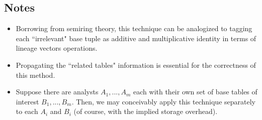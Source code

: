 \subsection{Notes}
\begin{itemize}
    \item Borrowing from semiring theory, this technique can be analogized to tagging each ``irrelevant" base tuple as additive and multiplicative identity in terms of lineage vectors operations.
    \item Propagating the ``related tables" information is essential for the correctness of this method.
    \item Suppose there are analysts $A_1, ..., A_m$ each with their own set of base tables of interest $B_1, ..., B_m$.
    Then, we may conceivably apply this technique separately to each $A_i$ and $B_i$ (of course, with the implied storage overhead).
\end{itemize}


